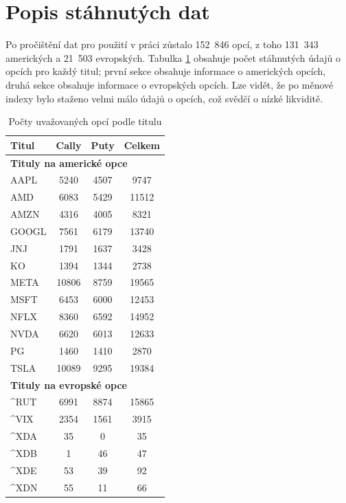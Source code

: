 \documentclass[male,czech,api_bc]{kitheses}
\begin{document}
  \section{Popis stáhnutých dat}

  Po pročištění dat pro použití v práci zůstalo 152~846 opcí, z toho 131~343 amerických a 21~503 evropských. Tabulka \ref{tab:count_by_ticker} obsahuje počet stáhnutých údajů o opcích pro každý titul; první sekce obsahuje informace o amerických opcích, druhá sekce obsahuje informace o evropských opcích. Lze vidět, že po měnové indexy bylo staženo velmi málo údajů o opcích, což svědčí o nízké likviditě.

  \begin{table}[h!]
    \centering
    \caption{Počty uvažovaných opcí podle titulu}
    \label{tab:count_by_ticker}
    \begin{tabular}{lccc}
      \toprule
      Titul & Cally & Puty & Celkem \\
      \midrule
      \multicolumn{4}{l}{\textbf{Tituly na americké opce}} \\
      AAPL & 5240 & 4507 & 9747 \\
      AMD & 6083 & 5429 & 11512 \\
      AMZN & 4316 & 4005 & 8321 \\
      GOOGL & 7561 & 6179 & 13740 \\
      JNJ & 1791 & 1637 & 3428 \\
      KO & 1394 & 1344 & 2738 \\
      META & 10806 & 8759 & 19565 \\
      MSFT & 6453 & 6000 & 12453 \\
      NFLX & 8360 & 6592 & 14952 \\
      NVDA & 6620 & 6013 & 12633 \\
      PG & 1460 & 1410 & 2870 \\
      TSLA & 10089 & 9295 & 19384 \\
      \midrule
      \multicolumn{4}{l}{\textbf{Tituly na evropské opce}} \\
      \textasciicircum{}RUT & 6991 & 8874 & 15865 \\
      \textasciicircum{}VIX & 2354 & 1561 & 3915 \\
      \textasciicircum{}XDA & 35 & 0 & 35 \\
      \textasciicircum{}XDB & 1 & 46 & 47 \\
      \textasciicircum{}XDE & 53 & 39 & 92 \\
      \textasciicircum{}XDN & 55 & 11 & 66 \\
      \bottomrule
    \end{tabular}
  \end{table}
\end{document}
